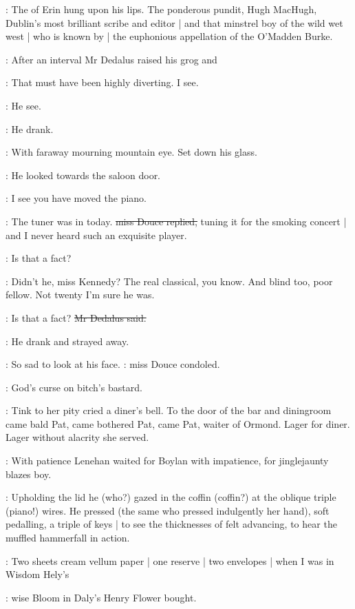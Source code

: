 \lenehan:
The  of Erin hung upon his lips.
The ponderous pundit, Hugh MacHugh,
Dublin's most brilliant scribe and editor |
and that minstrel boy of the wild wet west |
who is known by |
the euphonious appellation of the O'Madden
Burke.

:
After an interval
Mr Dedalus raised his grog and

\simon:
That must have been highly diverting.
I see.

:
He see.

:
He drank.

:
With faraway mourning mountain eye.
Set down his glass.

:
He looked towards the saloon door.

\simon:
I see you have moved the piano.

\MissD:
The tuner was in today.
\sout{miss Douce replied,}
tuning it for the smoking concert |
and I never heard such an exquisite player.

\simon:
Is that a fact?

\MissD:
Didn't he, miss Kennedy?
The real classical, you know.
And blind too, poor fellow.
Not twenty I'm sure he was.

\simon:
Is that a fact?
\sout{Mr Dedalus said.}

:
He drank and strayed away.

\MissD:
So sad to look at his face.
:
miss Douce condoled.

\stripling:
God's curse on bitch's bastard.

:
Tink to her pity cried a diner's bell.
To the door of the bar and diningroom came bald Pat,
came bothered Pat,
came Pat,
waiter of Ormond.
Lager for diner.
Lager without alacrity she served.


:
With patience 
Lenehan waited for Boylan with impatience,
for jinglejaunty
blazes boy.

:
Upholding the lid he (who?)
gazed in the coffin (coffin?)
at the oblique triple (piano!) wires.
He pressed
(the same who pressed indulgently her hand),
soft pedalling,
a triple of keys |
to see the thicknesses of felt advancing,
to hear the muffled hammerfall in action.

\BloomInt:
Two sheets cream vellum paper |
one reserve |
two envelopes |
when I was
in Wisdom Hely's

:
wise Bloom in Daly's Henry Flower bought.

